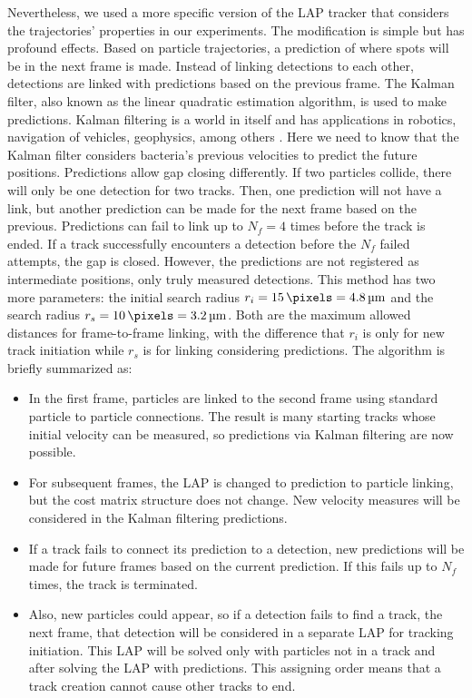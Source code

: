 Nevertheless, we used a more specific version of the LAP tracker that considers the trajectories' properties in our experiments. The modification is simple but has profound effects. Based on particle trajectories, a prediction of where spots will be in the next frame is made. Instead of linking detections to each other, detections are linked with predictions based on the previous frame. The Kalman filter, also known as the linear quadratic estimation algorithm, is used to make predictions. Kalman filtering is a world in itself and has applications in robotics, navigation of vehicles,  geophysics, among others \cite{Auger2013IndustrialReview,Aanonsen2009TheReview}. Here we need to know that the Kalman filter considers bacteria's previous velocities to predict the future positions. Predictions allow gap closing differently. If two particles collide, there will only be one detection for two tracks. Then, one prediction will not have a link, but another prediction can be made for the next frame based on the previous. Predictions can fail to link up to $N_f=4$ times before the track is ended. If a track successfully encounters a detection before the $N_f$ failed attempts, the gap is closed. However, the predictions are not registered as intermediate positions, only truly measured detections. This method has two more parameters: the initial search radius $r_i=\SI{15}{\pixels}=\SI{4.8}{\micro\meter}$ and the search radius $r_s=\SI{10}{\pixels}=\SI{3.2}{\micro\meter}$. Both are the maximum allowed distances for frame-to-frame linking, with the difference that $r_i$ is only for new track initiation while $r_s$ is for linking considering predictions. The algorithm is briefly summarized as:

\begin{itemize}
	\item In the first frame, particles are linked to the second frame using standard particle to particle connections. The result is many starting tracks whose initial velocity can be measured, so predictions via Kalman filtering are now possible.
	\item For subsequent frames, the LAP is changed to prediction to particle linking, but the cost matrix structure does not change. New velocity measures will be considered in the Kalman filtering predictions.
	\item If a track fails to connect its prediction to a detection, new predictions will be made for future frames based on the current prediction. If this fails up to $N_f$ times, the track is terminated.
	\item Also, new particles could appear, so if a detection fails to find a track, the next frame, that detection will be considered in a separate LAP for tracking initiation. This LAP will be solved only with particles not in a track and after solving the LAP with predictions. This assigning order means that a track creation cannot cause other tracks to end.
\end{itemize}

